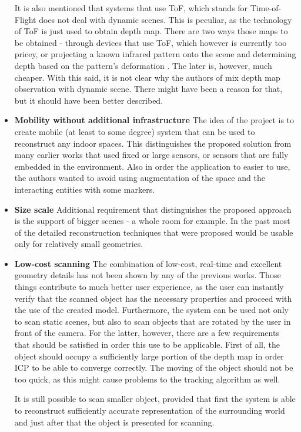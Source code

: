 \documentclass[12pt, a4paper]{article}
\theoremstyle{plain}
\begin{document}
\begin{itemize}
      It is also mentioned that systems that use ToF, which stands for
      Time-of-Flight does not deal with dynamic scenes. This is peculiar, as the
      technology of ToF is just used to obtain depth map. There are two ways
      those maps to be obtained - through devices that use ToF, which however is
      currently too pricey, or projecting a known infrared pattern onto the
      scene and determining depth based on the pattern's deformation
      \cite{body-scanning}. The later is, however, much cheaper. With this said,
      it is not clear why the authors of \cite{kinectfusion} mix depth map
      observation with dynamic scene. There might have been a reason for that,
      but it should have been better described.
    \item \textbf{Mobility without additional infrastructure} The idea of the
      project is to create mobile (at least to some degree) system that can be
      used to reconstruct any indoor spaces. This distinguishes the proposed
      solution from many earlier works that used fixed or large sensors, or
      sensors that are fully embedded in the environment. Also in order the
      application to easier to use, the authors wanted to avoid using
      augmentation of the space and the interacting entities with some markers.
    \item \textbf{Size scale} Additional requirement that distinguishes the
      proposed approach is the support of bigger scenes - a whole room for
      example. In the past most of the detailed reconstruction techniques that
      were proposed would be usable only for relatively small geometries.
    \item \textbf{Low-cost scanning} The combination of low-cost, real-time and
      excellent geometry details has not been shown by any of the previous
      works. Those things contribute to much better user experience, as the user
      can instantly verify that the scanned object has the necessary properties
      and proceed with the use of the created model. Furthermore, the system can
      be used not only to scan static scenes, but also to scan objects that are
      rotated by the user in front of the camera. For the latter, however, there
      are a few requirements that should be satisfied in order this use to be
      applicable. First of all, the object should occupy a sufficiently large
      portion of the depth map in order ICP to be able to converge correctly.
      The moving of the object should not be too quick, as this might cause
      problems to the tracking algorithm as well.

      It is still possible to scan smaller object, provided that first the
      system is able to reconstruct sufficiently accurate representation of the
      surrounding world and just after that the object is presented for
      scanning.
  \end{itemize}
\end{document}

